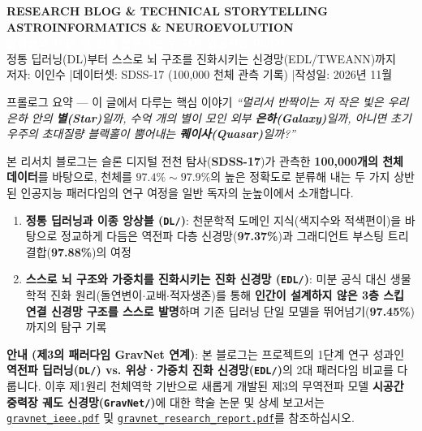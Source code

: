 \documentclass[11pt,a4paper]{article}
\begin{document}
\begin{tcolorbox}[
  enhanced,
  colback=NavyAccent,
  colframe=NavyAccent,
  arc=4pt,
  top=14pt, bottom=14pt, left=14pt, right=14pt
]
  {\sffamily\footnotesize\bfseries\textcolor{SoftBlueBg!85!white}{RESEARCH BLOG \& TECHNICAL STORYTELLING \;\textbullet\; ASTROINFORMATICS \& NEUROEVOLUTION}}\\[6pt]
  {\sffamily\LARGE\bfseries\textcolor{white}{밤하늘의 10만 개 빛을 분류하는 두 가지 인공지능 이야기}}\\[4pt]
  {\sffamily\large\textcolor{SoftBlueBg}{정통 딥러닝(DL)부터 스스로 뇌 구조를 진화시키는 신경망(EDL/TWEANN)까지}}\\[10pt]
  {\sffamily\small\textcolor{BorderGray}{저자: 이인수 \quad|\quad 데이터셋: SDSS-17 (100,000 천체 관측 기록) \quad|\quad 작성일: 2026년 11월}}
\end{tcolorbox}

\vspace{4pt}

\begin{insightbox}{프롤로그 요약 --- 이 글에서 다루는 핵심 이야기}
\emph{``멀리서 반짝이는 저 작은 빛은 우리 은하 안의 \textbf{별(Star)}일까, 수억 개의 별이 모인 외부 \textbf{은하(Galaxy)}일까, 아니면 초기 우주의 초대질량 블랙홀이 뿜어내는 \textbf{퀘이사(Quasar)}일까?''}

본 리서치 블로그는 슬론 디지털 전천 탐사(\textbf{SDSS-17})가 관측한 \textbf{100,000개의 천체 데이터}를 바탕으로, 천체를 $97.4\% \sim 97.9\%$의 높은 정확도로 분류해 내는 두 가지 상반된 인공지능 패러다임의 연구 여정을 일반 독자의 눈높이에서 소개합니다.
\begin{enumerate}[leftmargin=18pt, itemsep=2pt, topsep=3pt]
  \item \textbf{정통 딥러닝과 이종 앙상블 (\texttt{DL/})}: 천문학적 도메인 지식(색지수와 적색편이)을 바탕으로 정교하게 다듬은 역전파 다층 신경망(\textbf{97.37\%})과 그래디언트 부스팅 트리 결합(\textbf{97.88\%})의 여정
  \item \textbf{스스로 뇌 구조와 가중치를 진화시키는 진화 신경망 (\texttt{EDL/})}: 미분 공식 대신 생물학적 진화 원리(돌연변이$\cdot$교배$\cdot$적자생존)를 통해 \textbf{인간이 설계하지 않은 3층 스킵 연결 신경망 구조를 스스로 발명}하며 기존 딥러닝 단일 모델을 뛰어넘기(\textbf{97.45\%})까지의 탐구 기록
\end{enumerate}

\vspace{3pt}
\noindent\textbf{안내 (제3의 패러다임 GravNet 연계)}: 본 블로그는 프로젝트의 1단계 연구 성과인 \textbf{역전파 딥러닝(\texttt{DL/}) vs. 위상·가중치 진화 신경망(\texttt{EDL/})}의 2대 패러다임 비교를 다룹니다. 이후 제1원리 천체역학 기반으로 새롭게 개발된 제3의 무역전파 모델 \textbf{시공간 중력장 궤도 신경망(\texttt{GravNet/})}에 대한 학술 논문 및 상세 보고서는 \href{run:gravnet_ieee.pdf}{\texttt{gravnet\_ieee.pdf}} 및 \href{run:gravnet_research_report.pdf}{\texttt{gravnet\_research\_report.pdf}}를 참조하십시오.
\end{insightbox}
\end{document}
